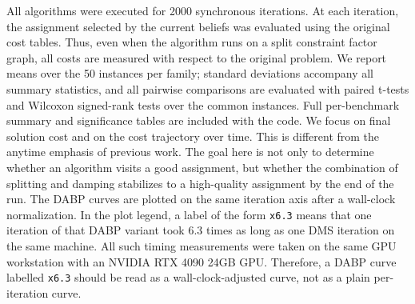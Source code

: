 All algorithms were executed for 2000 synchronous iterations.  At each
iteration, the assignment selected by the current beliefs was evaluated using
the original cost tables.  Thus, even when the algorithm runs on a split
constraint factor graph, all costs are measured with respect to the original
problem.  We report means over the 50 instances per family; standard
deviations accompany all summary statistics, and all pairwise comparisons are
evaluated with paired t-tests and Wilcoxon signed-rank tests over the common
instances.  Full per-benchmark summary and significance tables are included
with the code.
We focus on final solution cost and on the cost trajectory over time.  This is
different from the anytime emphasis of previous work.  The goal here is not
only to determine whether an algorithm visits a good assignment, but whether
the combination of splitting and damping stabilizes to a high-quality assignment
by the end of the run.
The DABP curves are plotted on the same iteration axis after a wall-clock
normalization.  In the plot legend, a label of the form \texttt{x6.3} means that
one iteration of that DABP variant took 6.3 times as long as one DMS iteration
on the same machine.  All such timing measurements were taken on the same
GPU workstation with an NVIDIA RTX 4090 24GB GPU.  Therefore, a DABP curve
labelled \texttt{x6.3} should be read as a wall-clock-adjusted curve, not as a
plain per-iteration curve.
